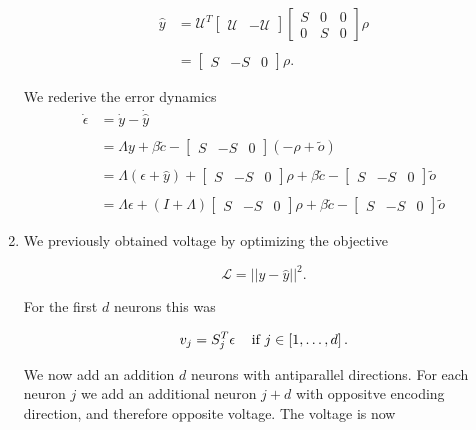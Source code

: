 \begin{enumerate}
\begin{align*}
\hat{y} &= \mathcal{U}^T \begin{bmatrix}
\mathcal{U} & -\mathcal{U}
\end{bmatrix}
\begin{bmatrix}
S & 0 & 0 
\\
0 & S & 0
\end{bmatrix}
\rho
\\
\\
&=
\begin{bmatrix}
S & -S & 0
\end{bmatrix}
\rho.
\end{align*}


We rederive the error dynamics 
\begin{align*}
\dot{\epsilon} &= \dot{y} - \dot{\hat{y}}
\\
\\
&=
\Lambda 
y
+ \beta
\tilde{c}
-
\begin{bmatrix}
S & -S & 0
\end{bmatrix}
\left( -\rho + \tilde{o}\right)
\\
\\
&= 
\Lambda 
\left(\epsilon + \hat{y} \right)
+
\begin{bmatrix}
S & -S & 0
\end{bmatrix}
\rho
+ \beta
\tilde{c}
-
\begin{bmatrix}
S & -S & 0
\end{bmatrix}
\tilde{o}
\\
\\
&=
\Lambda 
\epsilon 
+
\left(I + \Lambda\right)
\begin{bmatrix}
S & -S & 0
\end{bmatrix}
\rho
+ \beta
\tilde{c}
-
\begin{bmatrix}
S & -S & 0
\end{bmatrix}
\tilde{o}
\end{align*}

\item We previously obtained voltage by optimizing the objective

$$
\mathcal{L} = ||y - \hat{y}||^2. 
$$


For the first $d$ neurons this was 

$$
v_j = S_j^T \epsilon \hspace{3mm}  \text{ if } j \in \left[1, \hdots, d\right].
$$

We now add an addition $d$ neurons with antiparallel directions. For each neuron $j$ we add an additional neuron $j + d$ with oppositve encoding direction, and therefore opposite voltage. The voltage is now 


\end{enumerate}
